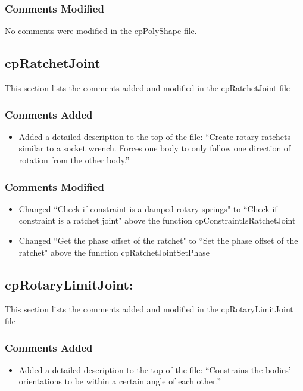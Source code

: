 \documentclass[12pt]{article}
\begin{document}
\subsubsection{Comments Modified}
No comments were modified in the cpPolyShape file.


\subsection{cpRatchetJoint} 
This section lists the comments added and modified  in the cpRatchetJoint file

\subsubsection{Comments Added}
\begin{itemize}
\item Added a detailed description to the top of the file: ``Create rotary ratchets similar to a socket wrench. Forces one body to only follow one direction
 of rotation from the other body.''
\end{itemize}

\subsubsection{Comments Modified}
\begin{itemize}
\item Changed ``Check if constraint is a damped rotary springs" to ``Check if constraint is a ratchet joint" above the function cpConstraintIsRatchetJoint
\item Changed ``Get the phase offset of the ratchet" to ``Set the phase offset of the ratchet" above the function cpRatchetJointSetPhase
\end{itemize}


\subsection{cpRotaryLimitJoint: } 
This section lists the comments added and modified  in the cpRotaryLimitJoint file

\subsubsection{Comments Added}
\begin{itemize}
\item Added a detailed description to the top of the file: ``Constrains the bodies' orientations to be within a certain angle of each other.''
\end{itemize}
\end{document}
